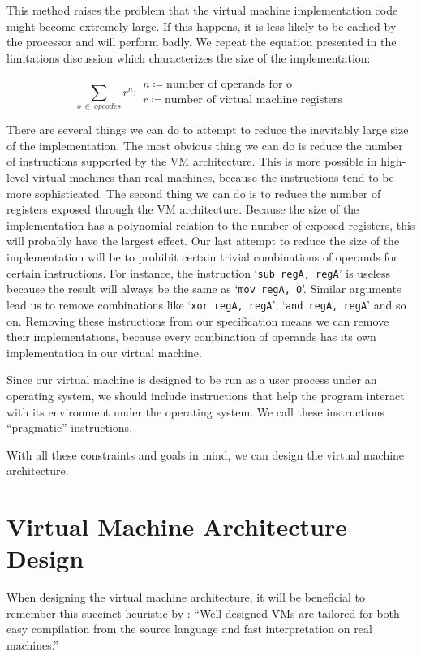 	This method raises the problem that the virtual machine implementation code might become extremely large. If this happens, it is less likely to be cached by the processor and will perform badly. We repeat the equation presented in the limitations discussion which characterizes the size of the implementation:
	
	\[
	\sum_{o~\in~opcodes} r^n : 
	\begin{array}{l}
	n \coloneqq \text{number of operands for o} \\
	r \coloneqq \text{number of virtual machine registers}
	\end{array}
	\] 
	
	There are several things we can do to attempt to reduce the inevitably large size of the implementation. The most obvious thing we can do is reduce the number of instructions supported by the VM architecture. This is more possible in high-level virtual machines than real machines, because the instructions tend to be more sophisticated. The second thing we can do is to reduce the number of registers exposed through the VM architecture. Because the size of the implementation has a polynomial relation to the number of exposed registers, this will probably have the largest effect. Our last attempt to reduce the size of the implementation will be to prohibit certain trivial combinations of operands for certain instructions. For instance, the instruction `\texttt{sub regA, regA}' is useless because the result will always be the same as `\texttt{mov regA, 0}'. Similar arguments lead us to remove combinations like `\texttt{xor regA, regA}', `\texttt{and regA, regA}' and so on. Removing these instructions from our specification means we can remove their implementations, because every combination of operands has its own implementation in our virtual machine.
	
	Since our virtual machine is designed to be run as a user process under an operating system, we should include instructions that help the program interact with its environment under the operating system. We call these instructions ``pragmatic'' instructions.
	
	With all these constraints and goals in mind, we can design the virtual machine architecture.
	
	\section{Virtual Machine Architecture Design}
		When designing the virtual machine architecture, it will be beneficial to remember this succinct heuristic by \cite{structureinterpreters}: ``Well-designed VMs are tailored for both easy compilation from the source language and fast interpretation on real machines.'' 
		
